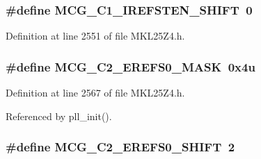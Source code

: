 \subsubsection[{\texorpdfstring{M\+C\+G\+\_\+\+C1\+\_\+\+I\+R\+E\+F\+S\+T\+E\+N\+\_\+\+S\+H\+I\+FT}{MCG_C1_IREFSTEN_SHIFT}}]{\setlength{\rightskip}{0pt plus 5cm}\#define M\+C\+G\+\_\+\+C1\+\_\+\+I\+R\+E\+F\+S\+T\+E\+N\+\_\+\+S\+H\+I\+FT~0}\hypertarget{group___m_c_g___register___masks_ga10e0a80bfe715350aba6d5f5212617bc}{}\label{group___m_c_g___register___masks_ga10e0a80bfe715350aba6d5f5212617bc}


Definition at line 2551 of file M\+K\+L25\+Z4.\+h.

\subsubsection[{\texorpdfstring{M\+C\+G\+\_\+\+C2\+\_\+\+E\+R\+E\+F\+S0\+\_\+\+M\+A\+SK}{MCG_C2_EREFS0_MASK}}]{\setlength{\rightskip}{0pt plus 5cm}\#define M\+C\+G\+\_\+\+C2\+\_\+\+E\+R\+E\+F\+S0\+\_\+\+M\+A\+SK~0x4u}\hypertarget{group___m_c_g___register___masks_gae9a32b79976c185a9b6567cc74b2d5af}{}\label{group___m_c_g___register___masks_gae9a32b79976c185a9b6567cc74b2d5af}


Definition at line 2567 of file M\+K\+L25\+Z4.\+h.



Referenced by pll\+\_\+init().

\subsubsection[{\texorpdfstring{M\+C\+G\+\_\+\+C2\+\_\+\+E\+R\+E\+F\+S0\+\_\+\+S\+H\+I\+FT}{MCG_C2_EREFS0_SHIFT}}]{\setlength{\rightskip}{0pt plus 5cm}\#define M\+C\+G\+\_\+\+C2\+\_\+\+E\+R\+E\+F\+S0\+\_\+\+S\+H\+I\+FT~2}\hypertarget{group___m_c_g___register___masks_ga1cea960436deb685a7f131203e4898b5}{}\label{group___m_c_g___register___masks_ga1cea960436deb685a7f131203e4898b5}


